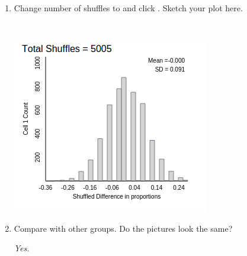 \begin{enumerate}
\begin{enumerate}
         Click  four more times, and record all 5
         differences. 
\begin{students}
        \vspace{1cm}\\
\end{students}
\begin{key}
  \\ {\it AWV}
\end{key}
       \item Change number of shuffles to  and click
         . Sketch your plot here.
\begin{students}
        \vspace{4cm}\\
\end{students}
\begin{key}
  
   \includegraphics[width=.4\linewidth]{plots/SATprep-shuffles.png}
\end{key}
     \item Compare with other groups.  Do the pictures look the
       same?
\begin{key}
  {\it  Yes. }
\end{key}



\end{enumerate}
\end{enumerate}
